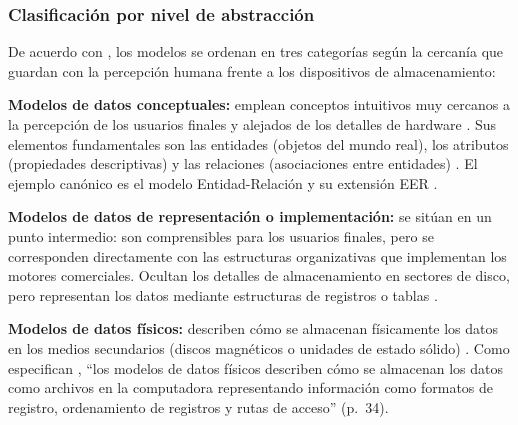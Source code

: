 \subsubsection{Clasificación por nivel de abstracción}

De acuerdo con \textcite[pp.~33--34]{elmasri_navathe}, los modelos se ordenan en tres categorías según la cercanía que guardan con la percepción humana frente a los dispositivos de almacenamiento:

\textbf{Modelos de datos conceptuales:} emplean conceptos intuitivos muy cercanos a la percepción de los usuarios finales y alejados de los detalles de hardware \parencite[p.~33]{elmasri_navathe}. Sus elementos fundamentales son las entidades (objetos del mundo real), los atributos (propiedades descriptivas) y las relaciones (asociaciones entre entidades) \parencites[p.~11]{chen_er_model}[p.~33]{elmasri_navathe}. El ejemplo canónico es el modelo Entidad-Relación y su extensión EER \parencite[p.~33]{elmasri_navathe}.

\textbf{Modelos de datos de representación o implementación:} se sitúan en un punto intermedio: son comprensibles para los usuarios finales, pero se corresponden directamente con las estructuras organizativas que implementan los motores comerciales. Ocultan los detalles de almacenamiento en sectores de disco, pero representan los datos mediante estructuras de registros o tablas \parencite[p.~33]{elmasri_navathe}.

\textbf{Modelos de datos físicos:} describen cómo se almacenan físicamente los datos en los medios secundarios (discos magnéticos o unidades de estado sólido) \parencite[p.~33]{elmasri_navathe}. Como especifican \textcite{elmasri_navathe}, \enquote{los modelos de datos físicos describen cómo se almacenan los datos como archivos en la computadora representando información como formatos de registro, ordenamiento de registros y rutas de acceso} (p.~34).
